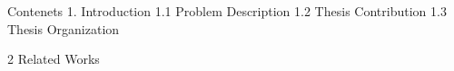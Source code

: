 Contenets
1. Introduction
1.1 Problem Description
1.2 Thesis Contribution
1.3 Thesis Organization

2 Related Works
